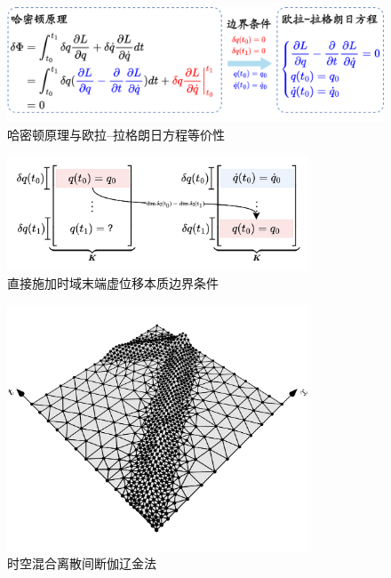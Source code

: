 \begin{figure}[!h]
    \centering 
    \includegraphics[width=\textwidth]{figures/Hamilton.png}
    \caption{哈密顿原理与欧拉--拉格朗日方程等价性}
    \label{fg:hamilton}
\end{figure}

\begin{figure}[!h]
    \centering 
    \includegraphics[width=0.8\textwidth]{figures/stiffness.png}
    \caption{直接施加时域末端虚位移本质边界条件}
    \label{fg:direct}
\end{figure}

\begin{figure}[!h]
    \centering 
    \includegraphics[width=0.8\textwidth]{figures/wave.png}
    \caption{时空混合离散间断伽辽金法}
    \label{fg:slab}
\end{figure}

